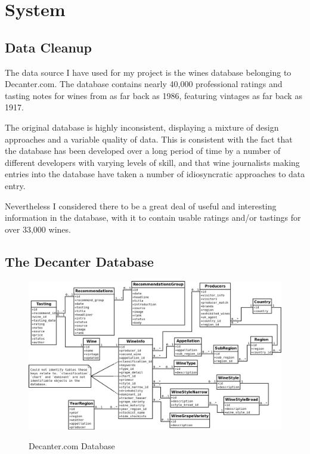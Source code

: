 \section{System}\label{design}

\subsection{Data Cleanup}

The data source I have used for my project is the wines database belonging to Decanter.com\cite{DecanterCom}. The database contains nearly 40,000 professional ratings and tasting notes for wines from as far back as 1986, featuring vintages as far back as 1917.

The original database is highly inconsistent, displaying a mixture of design approaches and a variable quality of data. This is consistent with the fact that the database has been developed over a long period of time by a number of different developers with varying levels of skill, and that wine journalists making entries into the database have taken a number of idiosyncratic approaches to data entry.

Nevertheless I considered there to be a great deal of useful and interesting information in the database, with it to contain usable ratings and/or tastings for over 33,000 wines.

\subsection{The Decanter Database}

\begin{figure}[h!]
    \caption{Decanter.com Database}
    \centering
        \includegraphics[width=14cm]{DecanterWineDB}
    \label{fig:decanterdb}
\end{figure}


